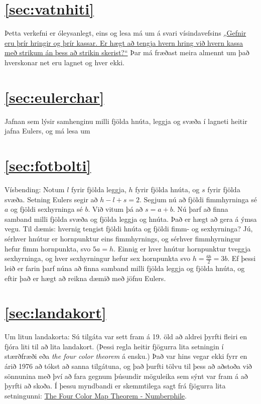 \documentclass[b5paper,12pt]{book}
\begin{document}
\section*{\ref{sec:vatnhiti}}
Þetta verkefni er óleysanlegt, eins og lesa má um á svari vísindavefsins \href{http://visindavefur.is/svar.php?id=53461}{„Gefnir eru þrír hringir og þrír kassar. Er hægt að tengja hvern hring við hvern kassa með strikum án þess að strikin skerist?“} Þar má fræðast meira almennt um það hverskonar net eru lagnet og hver ekki.

\section*{\ref{sec:eulerchar}}
Jafnan sem lýsir samhenginu milli fjölda hnúta, leggja og svæða í lagneti heitir jafna Eulers, og má lesa um 

\section*{\ref{sec:fotbolti}}
Vísbending: Notum $l$ fyrir fjölda leggja, $h$ fyrir fjölda hnúta, og $s$ fyrir fjölda svæða. Setning Eulers segir að $h-l+s=2$. Segjum nú að fjöldi fimmhyrninga sé $a$ og fjöldi sexhyrninga sé $b$. Við vitum þá að $s=a+b$. Nú þarf að finna samband milli fjölda svæða og fjölda leggja og hnúta. Það er hægt að gera á ýmsa vegu. Til dæmis: hvernig tengist fjöldi hnúta og fjöldi fimm- og sexhyrninga? Jú, sérhver hnútur er hornpunktur eins fimmhyrnings, og sérhver fimmhyrningur hefur fimm hornpunkta, svo $5a=h$. Einnig er hver hnútur hornpunktur tveggja sexhyrninga, og hver sexhyrningur hefur sex hornpunkta svo $h= \frac{6b}{2}=3b$. Ef þessi leið er farin þarf núna að finna samband milli fjölda leggja og fjölda hnúta, og eftir það er hægt að reikna dæmið með jöfnu Eulers. 

\section*{\ref{sec:landakort}}
Um litun landakorta: Sú tilgáta var sett fram á 19. öld að aldrei þyrfti fleiri en fjóra liti til að lita landakort. (Þessi regla heitir fjögurra lita setningin í stærðfræði eða \textit{the four color theorem} á ensku.) Það var hins vegar ekki fyrr en árið 1976 að tókst að sanna tilgátuna, og það þurfti tölvu til þess að aðstoða við sönnunina með því að fara gegnum þúsundir möguleika sem sýnt var fram á að þyrfti að skoða. Í þessu myndbandi er skemmtilega sagt frá fjögurra lita setningunni: \href{https://youtu.be/NgbK43jB4rQ}{The Four Color Map Theorem - Numberphile}.
\end{document}
